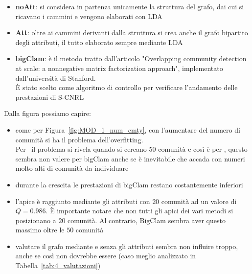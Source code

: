 \begin{itemize}
	\item \textbf{noAtt}: si considera in partenza unicamente la struttura del grafo, dai cui si ricavano i cammini e vengono elaborati con LDA
	\item \textbf{Att}: oltre ai cammini derivanti dalla struttura si crea anche il grafo bipartito degli attributi, il tutto elaborato sempre mediante LDA
	\item \textbf{bigClam}: è il metodo tratto dall'articolo "Overlapping community detection at scale: a nonnegative matrix factorization approach"\cite{bigClam_paper}, implementato dall'università di Stanford\cite{bigClam_code}.\\
	È stato scelto come algoritmo di controllo per verificare l'andamento delle prestazioni di S-CNRL
\end{itemize}
Dalla figura possiamo capire:
\begin{itemize}
	\item come per Figura~\ref{fig:MOD_1_num_cmty}, con l'aumentare del numero di comunità si ha il problema dell'overfitting.\\
	Per \citeseer\ il problema si rivela quando si cercano $50$ comunità e così è per \cora, questo sembra non valere per bigClam anche se è inevitabile che accada con numeri molto alti di comunità da individuare
	\item durante la crescita le prestazioni di bigClam restano costantemente inferiori
	\item l'apice è raggiunto mediante gli attributi con $20$ comunità ad un valore di $Q=0.986$. È importante notare che non tutti gli apici dei vari metodi si posizionano a $20$ comunità. Al contrario, BigClam sembra aver questo massimo oltre le $50$ comunità
	\item valutare il grafo mediante e senza gli attributi sembra non influire troppo, anche se così non dovrebbe essere (caso meglio analizzato in Tabella~\ref{tab:4_valutazioni})
\end{itemize}
%
